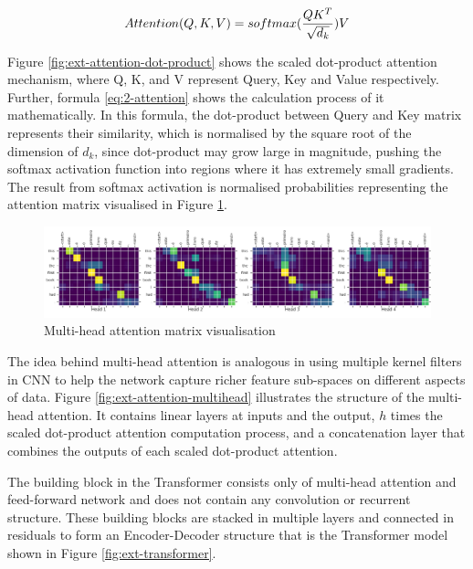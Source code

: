 \begin{equation}
    Attention(Q, K, V) = softmax(\frac{QK^T}{\sqrt{d_k}})V
    \eqcite{vaswani2017attention}
    \label{eq:2-attention}
\end{equation}

Figure \ref{fig:ext-attention-dot-product} shows the scaled dot-product attention mechanism, where Q, K, and V represent Query, Key and Value respectively.
Further, formula \ref{eq:2-attention} shows the calculation process of it mathematically.
In this formula, the dot-product between Query and Key matrix represents their similarity, which is normalised by the square root of the dimension of $d_k$, since dot-product may grow large in magnitude, pushing the softmax activation function into regions where it has extremely small gradients.
The result from softmax activation is normalised probabilities representing the attention matrix visualised in Figure  \ref{fig:ext-attention_map_portuguese}.

\begin{figure}[!ht]
    \centering
    \includegraphics[width=\textwidth]{literature/imgs/ext-attention_map_portuguese.png}
    \caption{Multi-head attention matrix visualisation \cite{tensorflow2021transformer}}
    \label{fig:ext-attention_map_portuguese}
\end{figure}

The idea behind multi-head attention is analogous in using multiple kernel filters in CNN to help the network capture richer feature sub-spaces on different aspects of data.
Figure \ref{fig:ext-attention-multihead} illustrates the structure of the multi-head attention. It contains linear layers at inputs and the output, $h$ times the scaled dot-product attention computation process, and a concatenation layer that combines the outputs of each scaled dot-product attention.

The building block in the Transformer consists only of multi-head attention and feed-forward network and does not contain any convolution or recurrent structure.
These building blocks are stacked in multiple layers and connected in residuals to form an Encoder-Decoder structure that is the Transformer model shown in Figure \ref{fig:ext-transformer}.

